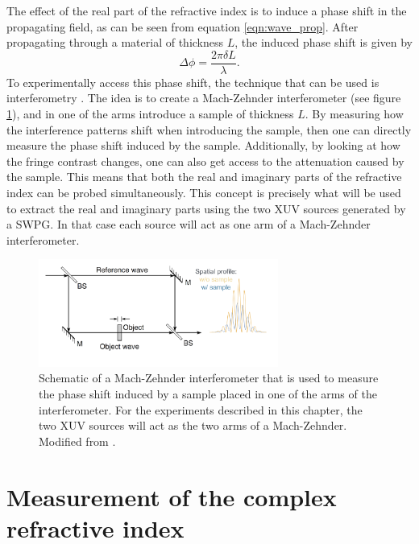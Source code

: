 The effect of the real part of the refractive index is to induce a phase shift in the propagating field, as can be seen from equation \ref{eqn:wave_prop}.  After propagating through a material of thickness $L$, the induced phase shift is given by
\begin{equation}
\label{eqn:phase_shift}
	\Delta\phi=\frac{2\pi\delta L}{\lambda}.
\end{equation}
To experimentally access this phase shift, the technique that can be used is interferometry \cite{hemmersDirectMeasurementComplex2012, hemmersMulticolorXUVInterferometry2009, wilsonDoubleSlitInterferometry2012}. The idea is to create a Mach-Zehnder interferometer (see figure \ref{fig:mach-zehnder_interferometer}), and in one of the arms introduce a sample of thickness $L$. By measuring how the interference patterns shift when introducing the sample, then one can directly measure the phase shift induced by the sample.  Additionally, by looking at how the fringe contrast changes, one can also get access to the attenuation caused by the sample.  This means that both the real and imaginary parts of the refractive index can be probed simultaneously.  This concept is precisely what will be used to extract the real and imaginary parts using the two XUV sources generated by a SWPG.  In that case each source will act as one arm of a Mach-Zehnder interferometer.
\begin{figure}
	\centering
	\includegraphics[width=0.7\textwidth]{figures/refractive_index/mach_zehnder_phase_shift.png}
	\caption[Schematic of Mach-Zehnder interferometer and spatial profile with and without a sample in one arm of the interferometer]{Schematic of a Mach-Zehnder interferometer that is used to measure the phase shift induced by a sample placed in one of the arms of the interferometer.  For the experiments described in this chapter, the two XUV sources will act as the two arms of a Mach-Zehnder.  Modified from \cite{attwoodSoftXraysExtreme2000}.}
	\label{fig:mach-zehnder_interferometer}
\end{figure}

\section{Measurement of the complex refractive index}
